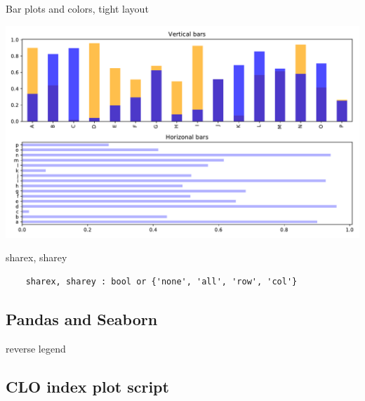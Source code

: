 \begin{frame}[fragile]
  {Bar plots and colors, tight layout}

\scriptsize


  \includegraphics[width=.7\textwidth]{codes/visualization/bar_plots.pdf}
\end{frame}

\begin{frame}[fragile]
    {sharex, sharey}

\scriptsize


\vfill
\normalsize
\begin{Verbatim}
    sharex, sharey : bool or {'none', 'all', 'row', 'col'}
\end{Verbatim}
\end{frame}

\subsection{Pandas and Seaborn}

\begin{frame}
    {reverse legend}
\end{frame}

\subsection{CLO index plot script}


